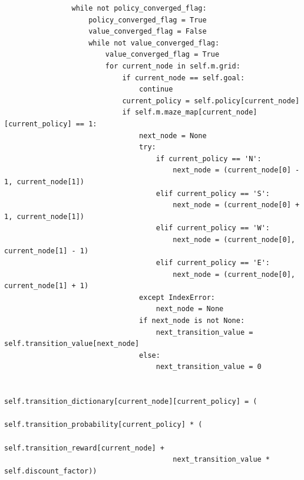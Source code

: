 \documentclass{article}
\begin{document}
\begin{lstlisting}
                while not policy_converged_flag:
                    policy_converged_flag = True
                    value_converged_flag = False
                    while not value_converged_flag:
                        value_converged_flag = True
                        for current_node in self.m.grid:
                            if current_node == self.goal:
                                continue
                            current_policy = self.policy[current_node]
                            if self.m.maze_map[current_node][current_policy] == 1:
                                next_node = None
                                try:
                                    if current_policy == 'N':
                                        next_node = (current_node[0] - 1, current_node[1])
                                    elif current_policy == 'S':
                                        next_node = (current_node[0] + 1, current_node[1])
                                    elif current_policy == 'W':
                                        next_node = (current_node[0], current_node[1] - 1)
                                    elif current_policy == 'E':
                                        next_node = (current_node[0], current_node[1] + 1)
                                except IndexError:
                                    next_node = None
                                if next_node is not None:
                                    next_transition_value = self.transition_value[next_node]
                                else:
                                    next_transition_value = 0
        
                                self.transition_dictionary[current_node][current_policy] = (
                                        self.transition_probability[current_policy] * (
                                        self.transition_reward[current_node] +
                                        next_transition_value * self.discount_factor))
        

\end{lstlisting}
\end{document}
